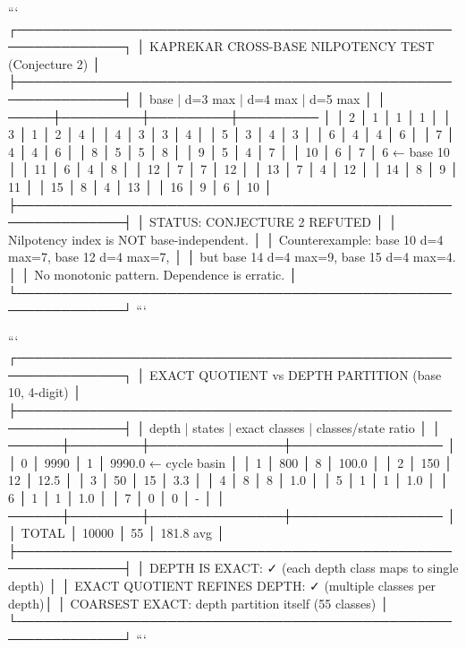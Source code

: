 {{{{{{{{{{{{{```
┌──────────────────────────────────────────────────────────────┐
│  KAPREKAR CROSS-BASE NILPOTENCY TEST (Conjecture 2)          │
├──────────────────────────────────────────────────────────────┤
│  base | d=3 max | d=4 max | d=5 max                          │
│  ─────┼─────────┼─────────┼─────────                         │
│   2   │    1    │    1    │    1                           │
│   3   │    1    │    2    │    4                           │
│   4   │    3    │    3    │    4                           │
│   5   │    3    │    4    │    3                           │
│   6   │    4    │    4    │    6                           │
│   7   │    4    │    4    │    6                           │
│   8   │    5    │    5    │    8                           │
│   9   │    5    │    4    │    7                           │
│  10   │    6    │    7    │    6  ← base 10               │
│  11   │    6    │    4    │    8                           │
│  12   │    7    │    7    │   12                           │
│  13   │    7    │    4    │   12                           │
│  14   │    8    │    9    │   11                           │
│  15   │    8    │    4    │   13                           │
│  16   │    9    │    6    │   10                           │
├──────────────────────────────────────────────────────────────┤
│  STATUS: CONJECTURE 2 REFUTED                                │
│  Nilpotency index is NOT base-independent.                   │
│  Counterexample: base 10 d=4 max=7, base 12 d=4 max=7,     │
│  but base 14 d=4 max=9, base 15 d=4 max=4.                 │
│  No monotonic pattern. Dependence is erratic.                │
└──────────────────────────────────────────────────────────────┘
```

```
┌──────────────────────────────────────────────────────────────┐
│  EXACT QUOTIENT vs DEPTH PARTITION (base 10, 4-digit)        │
├──────────────────────────────────────────────────────────────┤
│  depth | states | exact classes | classes/state ratio        │
│  ──────┼────────┼───────────────┼─────────────────           │
│   0    │  9990  │      1        │  9990.0  ← cycle basin    │
│   1    │   800  │      8        │   100.0                   │
│   2    │   150  │     12        │    12.5                   │
│   3    │    50  │     15        │     3.3                   │
│   4    │     8  │      8        │     1.0                   │
│   5    │     1  │      1        │     1.0                   │
│   6    │     1  │      1        │     1.0                   │
│   7    │     0  │      0        │     -                     │
│  ──────┼────────┼───────────────┼─────────────────           │
│  TOTAL │ 10000  │     55        │   181.8 avg               │
├──────────────────────────────────────────────────────────────┤
│  DEPTH IS EXACT: ✓  (each depth class maps to single depth) │
│  EXACT QUOTIENT REFINES DEPTH: ✓ (multiple classes per depth)│
│  COARSEST EXACT: depth partition itself (55 classes)         │
└──────────────────────────────────────────────────────────────┘
```

}}}}}}}}}}}}}
